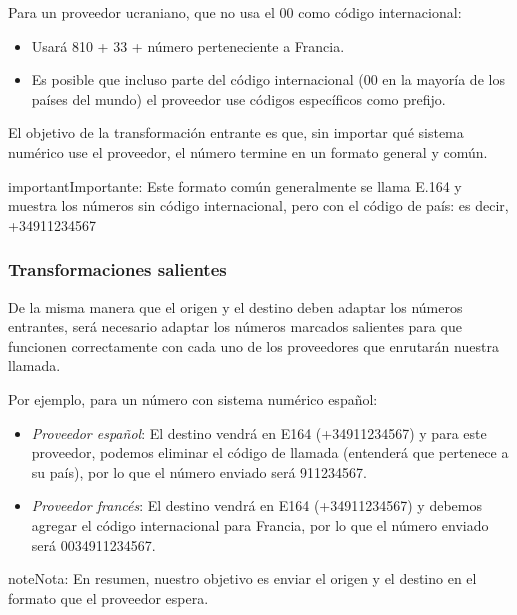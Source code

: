 \documentclass[letterpaper,10pt,spanish]{sphinxmanual}
\begin{document}
Para un proveedor ucraniano, que no usa el 00 como código internacional:
\begin{itemize}
\item {} 
Usará 810 + 33 + número perteneciente a Francia.

\item {} 
Es posible que incluso parte del código internacional (00 en la mayoría de los países del mundo) el proveedor use códigos específicos como prefijo.

\end{itemize}

El objetivo de la transformación entrante es que, sin importar qué sistema numérico use el proveedor, el número termine en un formato general y común.
\label{administration_portal/brand/settings/numeric_transformations:e164}
\begin{notice}{important}{Importante:}
Este formato común generalmente se llama E.164 y muestra los números sin código internacional, pero con el código de país: es decir, +34911234567
\end{notice}


\subsubsection{Transformaciones salientes}
\label{administration_portal/brand/settings/numeric_transformations:outgoing-transformations}
De la misma manera que el origen y el destino deben adaptar los números entrantes, será necesario adaptar los números marcados salientes para que funcionen correctamente con cada uno de los proveedores que enrutarán nuestra llamada.

Por ejemplo, para un número con sistema numérico español:
\begin{itemize}
\item {} 
\emph{Proveedor español}: El destino vendrá en E164 (+34911234567) y para este proveedor, podemos eliminar el código de llamada (entenderá que pertenece a su país), por lo que el número enviado será 911234567.

\item {} 
\emph{Proveedor francés}: El destino vendrá en E164 (+34911234567) y debemos agregar el código internacional para Francia, por lo que el número enviado será 0034911234567.

\end{itemize}

\begin{notice}{note}{Nota:}
En resumen, nuestro objetivo es enviar el origen y el destino en el formato que el proveedor espera.
\end{notice}
\end{document}
